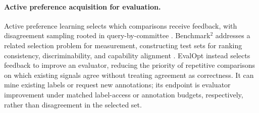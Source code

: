 \paragraph{Active preference acquisition for evaluation.}
Active preference learning selects which comparisons receive feedback, with disagreement sampling rooted in query-by-committee \citep{seung1992committee,muldrew2024activepreference,oh2025activepreference}.
Benchmark$^2$ addresses a related selection problem for measurement, constructing test sets for ranking consistency, discriminability, and capability alignment \citep{qian2026benchmark2}.
EvalOpt instead selects feedback to improve an evaluator, reducing the priority of repetitive comparisons on which existing signals agree without treating agreement as correctness.
It can mine existing labels or request new annotations; its endpoint is evaluator improvement under matched label-access or annotation budgets, respectively, rather than disagreement in the selected set.
